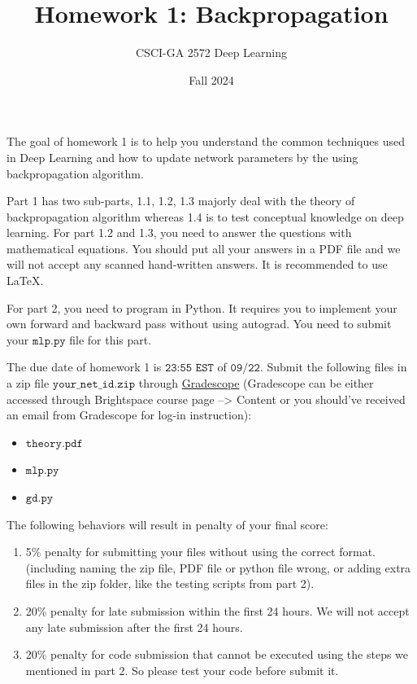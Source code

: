 \documentclass{article}
\title{Homework 1: Backpropagation}
\author{CSCI-GA 2572 Deep Learning}
\date{Fall 2024}
\begin{document}
\maketitle

The goal of homework 1 is to help you understand the common techniques used in
Deep Learning and how to update network parameters by the using backpropagation
algorithm.

Part 1 has two sub-parts, 1.1, 1.2, 1.3 majorly deal with the theory of
backpropagation algorithm whereas 1.4 is to test conceptual knowledge on deep
learning. For part 1.2 and 1.3, you need to answer the questions with
mathematical equations. You should put all your answers in a PDF file and we
will not accept any scanned hand-written answers. It is recommended to use
\LaTeX.

For part 2, you need to program in Python. It requires you to implement your
own forward and backward pass without using autograd. You need to submit your
$\texttt{mlp.py}$ file for this part.

The due date of homework 1 is $\texttt{23:55 EST}$ of $\texttt{09/22}$. Submit
the following files in a zip file $\texttt{your\_net\_id.zip}$ through
\href{https://www.gradescope.com}{Gradescope} (Gradescope can be either
accessed through Brightspace course page --> Content or you should've received
an email from Gradescope for log-in instruction):
\begin{itemize}
  \item $\texttt{theory.pdf}$
  \item $\texttt{mlp.py}$
  \item $\texttt{gd.py}$
\end{itemize}

The following behaviors will result in penalty of your final score:
\begin{enumerate}
  \item 5\% penalty for submitting your files without using the correct format. (including naming the zip file, PDF file or python file wrong, or adding extra files in the zip folder, like the testing scripts from part 2).
  \item 20\% penalty for late submission within the first 24 hours. We will not accept any late submission after the first 24 hours.
  \item 20\% penalty for code submission that cannot be executed using the steps we mentioned in part 2.
        So please test your code before submit it.
\end{enumerate}
\end{document}
